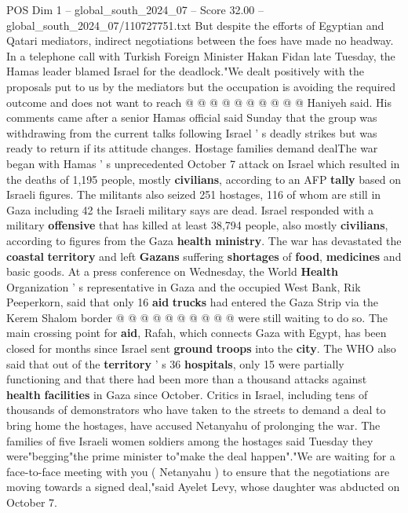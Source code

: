 \begin{textsample}{POS Dim 1 – global\_south\_2024\_07 – Score 32.00 – global\_south\_2024\_07/110727751.txt}
But despite the efforts of Egyptian and Qatari mediators, indirect negotiations between the foes have made no headway.
In a telephone call with Turkish Foreign Minister Hakan Fidan late Tuesday, the Hamas leader blamed Israel for the deadlock."We dealt positively with the proposals put to us by the mediators but the occupation is avoiding the required outcome and does not want to reach @ @ @ @ @ @ @ @ @ @ Haniyeh said.
His comments came after a senior Hamas official said Sunday that the group was withdrawing from the current talks following Israel ' s deadly strikes but was ready to return if its attitude changes.
Hostage families demand dealThe war began with Hamas ' s unprecedented October 7 attack on Israel which resulted in the deaths of 1,195 people, mostly \textbf{civilians}, according to an AFP \textbf{tally} based on Israeli figures.
The militants also seized 251 hostages, 116 of whom are still in Gaza including 42 the Israeli military says are dead.
Israel responded with a military \textbf{offensive} that has killed at least 38,794 people, also mostly \textbf{civilians}, according to figures from the Gaza \textbf{health} \textbf{ministry}.
The war has devastated the \textbf{coastal} \textbf{territory} and left \textbf{Gazans} suffering \textbf{shortages} of \textbf{food}, \textbf{medicines} and basic goods.
At a press conference on Wednesday, the World \textbf{Health} Organization ' s representative in Gaza and the occupied West Bank, Rik Peeperkorn, said that only 16 \textbf{aid} \textbf{trucks} had entered the Gaza Strip via the Kerem Shalom border @ @ @ @ @ @ @ @ @ @ were still waiting to do so.
The main crossing point for \textbf{aid}, Rafah, which connects Gaza with Egypt, has been closed for months since Israel sent \textbf{ground} \textbf{troops} into the \textbf{city}.
The WHO also said that out of the \textbf{territory} ' s 36 \textbf{hospitals}, only 15 were partially functioning and that there had been more than a thousand attacks against \textbf{health} \textbf{facilities} in Gaza since October.
Critics in Israel, including tens of thousands of demonstrators who have taken to the streets to demand a deal to bring home the hostages, have accused Netanyahu of prolonging the war.
The families of five Israeli women soldiers among the hostages said Tuesday they were"begging"the prime minister to"make the deal happen"."We are waiting for a face-to-face meeting with you ( Netanyahu ) to ensure that the negotiations are moving towards a signed deal,"said Ayelet Levy, whose daughter was abducted on October 7.

\end{textsample}
